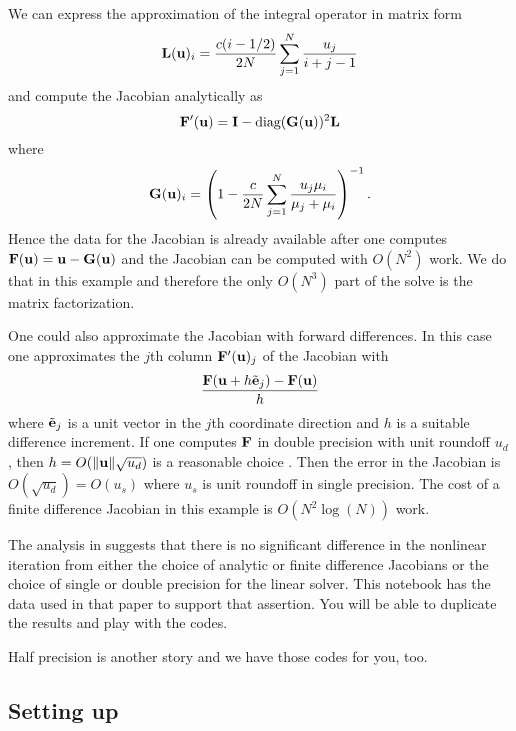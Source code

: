 \documentclass[11pt]{article}
\begin{document}
We can express the approximation of the integral operator in matrix form
\begin{equation}
{\bf L}({\bf u})_i = \frac{c (i - 1/2) }{2N} \sum_{j=1}^N \frac{u_j}{i+j -1}
\end{equation} and compute the Jacobian analytically as \begin{equation}
{\bf F}'({\bf u}) = {\bf I} - \mbox{diag}({\bf G}({\bf u}))^2 {\bf L}
\end{equation} where \begin{equation}
{\bf G}({\bf u})_i = \left(
1  - \frac{c}{2N} \sum_{j=1}^N \frac{u_j \mu_i}{\mu_j + \mu_i}
\right)^{-1}.
\end{equation} Hence the data for the Jacobian is already available
after one computes \({\bf F}({\bf u}) = {\bf u} - {\bf G}({\bf u})\) and the Jacobian can be
computed with \(O(N^2)\) work. We do that in this example and therefore
the only \(O(N^3)\) part of the solve is the matrix factorization.

One could also approximate the Jacobian with forward differences. In
this case one approximates the \(j\)th column \({\bf F}'({\bf u})_j\) of the
Jacobian with \begin{equation}
\frac{{\bf F}({\bf u} + h {\tilde {{\bf e}}}_j) - {\bf F}({\bf u})}{h}
\end{equation} where \({\tilde {{\bf e}}}_j\) is a unit vector in the \(j\)th
coordinate direction and \(h\) is a suitable difference increment. If
one computes \({\bf F}\) in double precision with unit roundoff \(u_d\),
then \(h =O(\| {\bf u} \| \sqrt{u_d})\) is a reasonable choice
\cite{ctk:roots}. Then the error in the Jacobian is
\(O(\sqrt{u_d}) = O(u_s)\) where \(u_s\) is unit roundoff in single
precision. The cost of a finite difference Jacobian in this example is
\(O(N^2 \log(N))\) work.

The analysis in \cite{ctk:sirev19} suggests that there is no significant
difference in the nonlinear iteration from either the choice of analytic
or finite difference Jacobians or the choice of single or double
precision for the linear solver. This notebook has the data used in that
paper to support that assertion. You will be able to duplicate the
results and play with the codes.

Half precision is another story and we have those codes for you, too.

    \hypertarget{setting-up}{%
\subsection{Setting up}\label{setting-up}}
\end{document}
